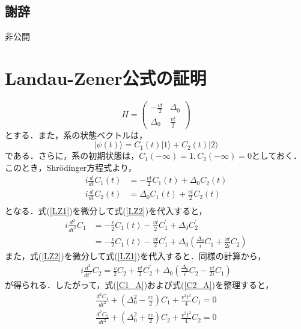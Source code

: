 \documentclass[a4paper, titlepage]{jsreport}
\begin{document}
\section*{謝辞}
非公開

\appendix
\chapter{Landau-Zener公式の証明}

\begin{equation}
  H = 
  \begin{pmatrix}
    -\frac{vt}{2} & \Delta_0\\
    \Delta_0 & \frac{vt}{2}
  \end{pmatrix}
\end{equation}
とする．また，系の状態ベクトルは，
\begin{equation}
  |\psi(t) \rangle = C_1(t) |1\rangle + C_2(t) |2\rangle
\end{equation}
である．さらに，系の初期状態は，$C_1(-\infty) = 1, C_2(-\infty) =0$としておく．このとき，Shr\"{o}dinger方程式より，
\begin{align}
  i\frac{d}{dt} C_1(t) &= -\frac{vt}{2} C_1(t) + \Delta_0 C_2(t) \label{LZ1}\\
  i\frac{d}{dt} C_2(t) &= \Delta_0 C_1(t) + \frac{vt}{2} C_2(t) \label{LZ2}\\
\end{align}
となる．式(\ref{LZ1})を微分して式(\ref{LZ2})を代入すると，
\begin{align}
  i\frac{d^2}{dt^2} C_1 &= -\frac{v}{2} C_1(t) -\frac{vt}{2} C_1^{\prime} + \Delta_0 C_2^{\prime}\\
  &= -\frac{v}{2} C_1(t) -\frac{vt}{2} C_1^{\prime} + \Delta_0 \left( \frac{\Delta_0}{i} C_1 + \frac{vt}{2i} C_2 \right) \label{C1_A}
\end{align}
また，式(\ref{LZ2})を微分して式(\ref{LZ1})を代入すると．同様の計算から，
\begin{align}
 i\frac{d^2}{dt^2} C_2 = \frac{v}{2} C_2 + \frac{vt}{2} C_2^{\prime} + \Delta_0 \left( \frac{\Delta_0}{i} C_2 - \frac{vt}{2i} C_1 \right) \label{C2_A}
\end{align}
が得られる．したがって，式(\ref{C1_A})および式(\ref{C2_A})を整理すると，
\begin{align}
  \frac{d^2 C_1}{dt^2} + \left( \Delta_0^2 - \frac{iv}{2} \right) C_1 + \frac{v^2 t^2}{4} C_1 = 0\\
  \frac{d^2 C_2}{dt^2} + \left( \Delta_0^2 + \frac{iv}{2} \right) C_2 + \frac{v^2 t^2}{4} C_2 = 0\\
\end{align}
\end{document}
